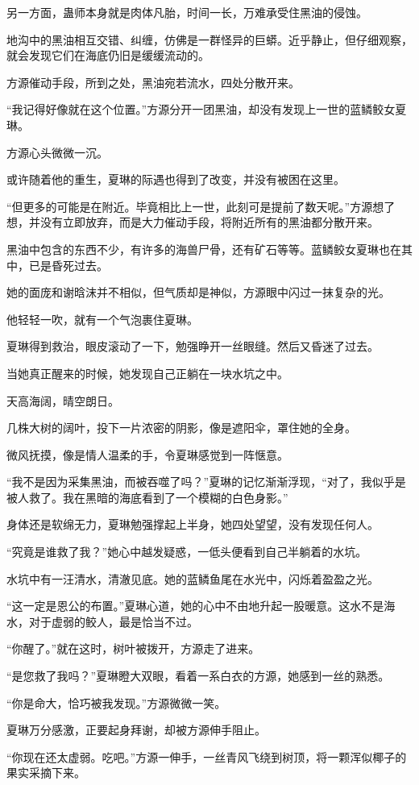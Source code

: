 \begin{this_body}
另一方面，蛊师本身就是肉体凡胎，时间一长，万难承受住黑油的侵蚀。

地沟中的黑油相互交错、纠缠，仿佛是一群怪异的巨蟒。近乎静止，但仔细观察，就会发现它们在海底仍旧是缓缓流动的。

方源催动手段，所到之处，黑油宛若流水，四处分散开来。

“我记得好像就在这个位置。”方源分开一团黑油，却没有发现上一世的蓝鳞鲛女夏琳。

方源心头微微一沉。

或许随着他的重生，夏琳的际遇也得到了改变，并没有被困在这里。

“但更多的可能是在附近。毕竟相比上一世，此刻可是提前了数天呢。”方源想了想，并没有立即放弃，而是大力催动手段，将附近所有的黑油都分散开来。

黑油中包含的东西不少，有许多的海兽尸骨，还有矿石等等。蓝鳞鲛女夏琳也在其中，已是昏死过去。

她的面庞和谢晗沫并不相似，但气质却是神似，方源眼中闪过一抹复杂的光。

他轻轻一吹，就有一个气泡裹住夏琳。

夏琳得到救治，眼皮滚动了一下，勉强睁开一丝眼缝。然后又昏迷了过去。

当她真正醒来的时候，她发现自己正躺在一块水坑之中。

天高海阔，晴空朗日。

几株大树的阔叶，投下一片浓密的阴影，像是遮阳伞，罩住她的全身。

微风抚摸，像是情人温柔的手，令夏琳感觉到一阵惬意。

“我不是因为采集黑油，而被吞噬了吗？”夏琳的记忆渐渐浮现，“对了，我似乎是被人救了。我在黑暗的海底看到了一个模糊的白色身影。”

身体还是软绵无力，夏琳勉强撑起上半身，她四处望望，没有发现任何人。

“究竟是谁救了我？”她心中越发疑惑，一低头便看到自己半躺着的水坑。

水坑中有一汪清水，清澈见底。她的蓝鳞鱼尾在水光中，闪烁着盈盈之光。

“这一定是恩公的布置。”夏琳心道，她的心中不由地升起一股暖意。这水不是海水，对于虚弱的鲛人，最是恰当不过。

“你醒了。”就在这时，树叶被拨开，方源走了进来。

“是您救了我吗？”夏琳瞪大双眼，看着一系白衣的方源，她感到一丝的熟悉。

“你是命大，恰巧被我发现。”方源微微一笑。

夏琳万分感激，正要起身拜谢，却被方源伸手阻止。

“你现在还太虚弱。吃吧。”方源一伸手，一丝青风飞绕到树顶，将一颗浑似椰子的果实采摘下来。


\end{this_body}
